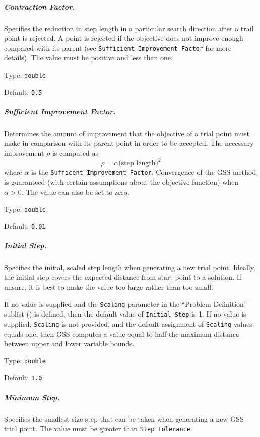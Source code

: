 \subparagraph{Contraction Factor.}  \label{param:GS-contract}
Specifies the reduction in step length in a particular search direction after
a trail point is rejected.  A point is rejected if the objective does not
improve enough compared with its parent (see {\tt Sufficient Improvement Factor}
for more details).
The value must be positive and less than one.

\hspace{0.2in}
Type: {\tt double}

\hspace{0.2in}
Default: {\tt 0.5}

\subparagraph{Sufficient Improvement Factor.}  \label{param:GS-suffimpr}
Determines the amount of improvement that the objective of a trial point must
make in comparison with its parent point in order to be accepted.
The necessary improvement $\rho$ is computed as
\[
  \rho = \alpha \mbox{(step length)}^2
\]
where $\alpha$ is the {\tt Sufficent Improvement Factor}.
Convergence of the GSS method is guaranteed (with certain assumptions about
the objective function) when $\alpha > 0$.
The value can also be set to zero.

\hspace{0.2in}
Type: {\tt double}

\hspace{0.2in}
Default: {\tt 0.01}

\subparagraph{Initial Step.}  \label{param:GS-initstep}
Specifies the initial, scaled step length when generating a new trial point.
Ideally, the initial step covers the expected distance from start point
to a solution.  If unsure, it is best to make the value too large rather than
too small.

\noindent
If no value is supplied and the {\tt Scaling} parameter in the
``Problem Definition'' sublist () is defined,
then the default value of {\tt Initial Step} is 1.
If no value is supplied, {\tt Scaling} is not provided, and the default
assignment of {\tt Scaling} values equals one, then
GSS computes a value equal to half the maximum distance between upper
and lower variable bounds.

\hspace{0.2in}
Type: {\tt double}

\hspace{0.2in}
Default: {\tt 1.0}

\subparagraph{Minimum Step.}  \label{param:GS-minstep}
Specifies the smallest size step that can be taken when generating a new
GSS trial point.  The value must be greater than {\tt Step Tolerance}.

